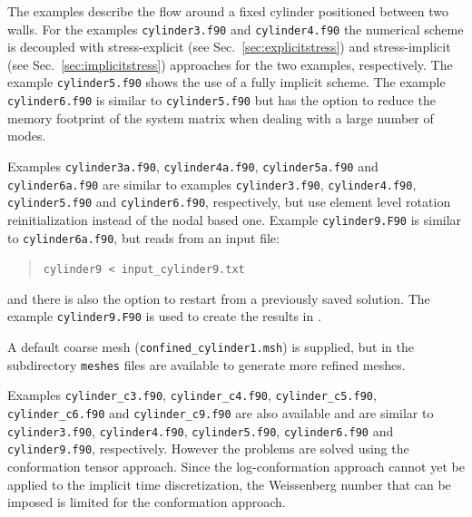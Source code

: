 The examples describe the flow
around a fixed cylinder positioned between two walls. For the examples \texttt{cylinder3.f90} and \texttt{cylinder4.f90} the numerical scheme is decoupled with
stress-explicit (see Sec.~\ref{sec:explicitstress}) and stress-implicit (see
Sec.~\ref{sec:implicitstress}) approaches for the two examples, respectively. The example \texttt{cylinder5.f90}
shows the use of a fully implicit scheme. The example \texttt{cylinder6.f90} is similar to \texttt{cylinder5.f90} but has the option to reduce the memory footprint of the system matrix when dealing with a large number of modes.

Examples \texttt{cylinder3a.f90}, \texttt{cylinder4a.f90}, \texttt{cylinder5a.f90} and \texttt{cylinder6a.f90} are similar to examples \texttt{cylinder3.f90}, \texttt{cylinder4.f90}, \texttt{cylinder5.f90} and \texttt{cylinder6.f90}, respectively, but use element level rotation reinitialization instead of the nodal based one.
Example \texttt{cylinder9.F90} is similar to \texttt{cylinder6a.f90}, but reads from an input file:
 \begin{quote}
   \texttt{cylinder9 < input\_cylinder9.txt}
\end{quote}
and there is also the option to restart from a previously saved solution. The example \texttt{cylinder9.F90} is used to create the results in \cite{JaenssonHulsen2024}.

A default coarse mesh (\texttt{confined\_cylinder1.msh}) is supplied, but in the
subdirectory \texttt{meshes} files are available to generate more refined 
meshes.

Examples \texttt{cylinder\_c3.f90}, \texttt{cylinder\_c4.f90}, \texttt{cylinder\_c5.f90}, \texttt{cylinder\_c6.f90} and \texttt{cylinder\_c9.f90} are also available
and are similar to \texttt{cylinder3.f90}, \texttt{cylinder4.f90}, \texttt{cylinder5.f90}, \texttt{cylinder6.f90} and \texttt{cylinder9.f90}, respectively. However 
the problems are solved using the conformation tensor approach. Since the log-conformation approach cannot yet be applied to the implicit time discretization, the Weissenberg number that can be imposed is limited for the conformation approach.

